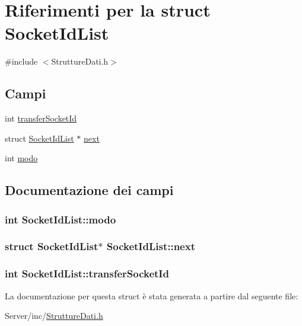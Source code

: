 \hypertarget{structSocketIdList}{\section{Riferimenti per la struct Socket\+Id\+List}
\label{structSocketIdList}
}


{\ttfamily \#include $<$Strutture\+Dati.\+h$>$}

\subsection*{Campi}
\begin{DoxyCompactItemize}
\item 
int \hyperlink{structSocketIdList_a5a7568a90af3231f5c125ef0c63e47db}{transfer\+Socket\+Id}
\item 
struct \hyperlink{structSocketIdList}{Socket\+Id\+List} $\ast$ \hyperlink{structSocketIdList_a6a4ac9d91704e30a162d520bca97a270}{next}
\item 
int \hyperlink{structSocketIdList_a84ef1b1879e61c17fe09e27e2038d0ee}{modo}
\end{DoxyCompactItemize}


\subsection{Documentazione dei campi}
\hypertarget{structSocketIdList_a84ef1b1879e61c17fe09e27e2038d0ee}{
\subsubsection[{modo}]{\setlength{\rightskip}{0pt plus 5cm}int Socket\+Id\+List\+::modo}}\label{structSocketIdList_a84ef1b1879e61c17fe09e27e2038d0ee}
\hypertarget{structSocketIdList_a6a4ac9d91704e30a162d520bca97a270}{
\subsubsection[{next}]{\setlength{\rightskip}{0pt plus 5cm}struct {\bf Socket\+Id\+List}$\ast$ Socket\+Id\+List\+::next}}\label{structSocketIdList_a6a4ac9d91704e30a162d520bca97a270}
\hypertarget{structSocketIdList_a5a7568a90af3231f5c125ef0c63e47db}{
\subsubsection[{transfer\+Socket\+Id}]{\setlength{\rightskip}{0pt plus 5cm}int Socket\+Id\+List\+::transfer\+Socket\+Id}}\label{structSocketIdList_a5a7568a90af3231f5c125ef0c63e47db}


La documentazione per questa struct è stata generata a partire dal seguente file\+:\begin{DoxyCompactItemize}
\item 
Server/inc/\hyperlink{StruttureDati_8h}{Strutture\+Dati.\+h}\end{DoxyCompactItemize}
